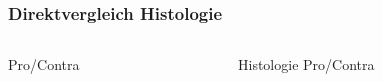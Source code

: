 \begin{frame}[label=current]
	\frametitle{Direktvergleich Histologie \leftrightarrow \uct}
		\begin{columns}
			\begin{column}{0.49\linewidth}
				\uct Pro/Contra
 			\end{column}
 			\begin{column}{0.49\linewidth}
 				Histologie Pro/Contra
 			\end{column}
 		\end{columns}
\end{frame}

